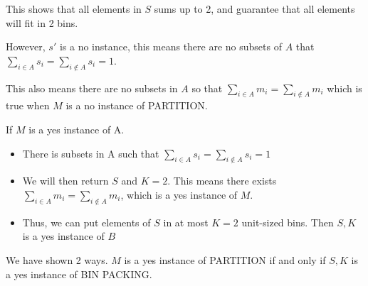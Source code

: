 \documentclass{cpsc413Solutions}
\begin{document}
\begin{problemlist}
\begin{problem}
\begin{answer}
\begin{itemize}
\begin{itemize}
        This shows that all elements in $S$ sums up to 2, and guarantee that all elements will fit in 2 bins. 
        
        However, $s'$ is a no instance, this means there are no subsets of $A$ that $\sum_{i \in A} s_i = \sum_{i \notin A} s_i= 1$.
        
        This also means there are no subsets in $A$ so that $\sum_{i \in A} m_i = \sum_{i \notin A} m_i$ which is true when $M$ is a no instance of PARTITION.
        
    \end{itemize}

    If $M$ is a yes instance of A.
    
    \begin{itemize}
        \item There is subsets in A such that $\sum_{i \in A} s_i = \sum_{i \notin A} s_i= 1$
        
        \item We will then return $S$ and $K =2$.
        This means there exists $\sum_{i \in A} m_i = \sum_{i \notin A} m_i$, which is a yes instance of $M$.
        
        \item Thus, we can put elements of $S$ in at most $K = 2 $ unit-sized bins. Then $S,K$ is a yes instance of $B$
    \end{itemize}
    
    We have shown 2 ways. $M$ is a yes instance of PARTITION if and only if $S, K$ is a yes instance of BIN PACKING. 
    
    
    
\end{itemize}
\end{answer}

\end{problem}

\end{problemlist}
\end{document}
